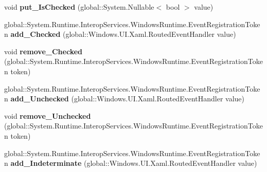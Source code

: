 \begin{DoxyCompactItemize}
void {\bfseries put\+\_\+\+Is\+Checked} (global\+::\+System.\+Nullable$<$ bool $>$ value)
\item 
\mbox{\label{interface_windows_1_1_u_i_1_1_xaml_1_1_controls_1_1_primitives_1_1_i_toggle_button_a9579b9435c7ea6041a3d25d96e4e02b6}} 
global\+::\+System.\+Runtime.\+Interop\+Services.\+Windows\+Runtime.\+Event\+Registration\+Token {\bfseries add\+\_\+\+Checked} (global\+::\+Windows.\+U\+I.\+Xaml.\+Routed\+Event\+Handler value)
\item 
\mbox{\label{interface_windows_1_1_u_i_1_1_xaml_1_1_controls_1_1_primitives_1_1_i_toggle_button_afa5ff3c678236b48b302c60a17489ad3}} 
void {\bfseries remove\+\_\+\+Checked} (global\+::\+System.\+Runtime.\+Interop\+Services.\+Windows\+Runtime.\+Event\+Registration\+Token token)
\item 
\mbox{\label{interface_windows_1_1_u_i_1_1_xaml_1_1_controls_1_1_primitives_1_1_i_toggle_button_af2a52e0a9086bccd03127ee7044692ab}} 
global\+::\+System.\+Runtime.\+Interop\+Services.\+Windows\+Runtime.\+Event\+Registration\+Token {\bfseries add\+\_\+\+Unchecked} (global\+::\+Windows.\+U\+I.\+Xaml.\+Routed\+Event\+Handler value)
\item 
\mbox{\label{interface_windows_1_1_u_i_1_1_xaml_1_1_controls_1_1_primitives_1_1_i_toggle_button_a4828a2c0dc3818cf5b0a8b6f35fbd268}} 
void {\bfseries remove\+\_\+\+Unchecked} (global\+::\+System.\+Runtime.\+Interop\+Services.\+Windows\+Runtime.\+Event\+Registration\+Token token)
\item 
\mbox{\label{interface_windows_1_1_u_i_1_1_xaml_1_1_controls_1_1_primitives_1_1_i_toggle_button_aa819460ff16c0555139f41a6ff334a9b}} 
global\+::\+System.\+Runtime.\+Interop\+Services.\+Windows\+Runtime.\+Event\+Registration\+Token {\bfseries add\+\_\+\+Indeterminate} (global\+::\+Windows.\+U\+I.\+Xaml.\+Routed\+Event\+Handler value)
\item 
\mbox{\label{interface_windows_1_1_u_i_1_1_xaml_1_1_controls_1_1_primitives_1_1_i_toggle_button_ab448af06ccc5e4eaca742a2ef9c88b2b}} 

\end{DoxyCompactItemize}
